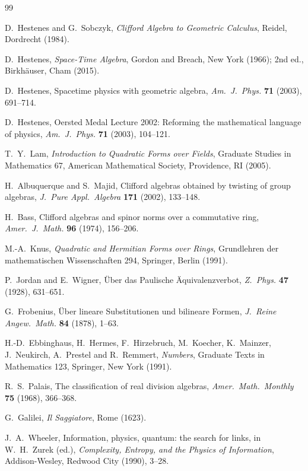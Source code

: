 \documentclass[11pt]{article}
\theoremstyle{plain}
\theoremstyle{definition}
\theoremstyle{plain}
\theoremstyle{definition}
\begin{document}
\begin{thebibliography}{99}

D.~Hestenes and G.~Sobczyk,
\emph{Clifford Algebra to Geometric Calculus},
Reidel, Dordrecht (1984).

D.~Hestenes,
\emph{Space-Time Algebra},
Gordon and Breach, New York (1966); 2nd ed., Birkh\"auser, Cham (2015).

D.~Hestenes,
Spacetime physics with geometric algebra,
\emph{Am.~J.~Phys.} \textbf{71} (2003), 691--714.

D.~Hestenes,
Oersted Medal Lecture 2002: Reforming the mathematical language of physics,
\emph{Am.~J.~Phys.} \textbf{71} (2003), 104--121.

T.~Y.~Lam,
\emph{Introduction to Quadratic Forms over Fields},
Graduate Studies in Mathematics 67, American Mathematical Society, Providence, RI (2005).

H.~Albuquerque and S.~Majid,
Clifford algebras obtained by twisting of group algebras,
\emph{J.~Pure Appl.~Algebra} \textbf{171} (2002), 133--148.

H.~Bass,
Clifford algebras and spinor norms over a commutative ring,
\emph{Amer.~J.~Math.} \textbf{96} (1974), 156--206.

M.-A.~Knus,
\emph{Quadratic and Hermitian Forms over Rings},
Grundlehren der mathematischen Wissenschaften 294, Springer, Berlin (1991).

P.~Jordan and E.~Wigner,
\"Uber das Paulische \"Aquivalenzverbot,
\emph{Z.~Phys.} \textbf{47} (1928), 631--651.

G.~Frobenius,
\"Uber lineare Substitutionen und bilineare Formen,
\emph{J.~Reine Angew.~Math.} \textbf{84} (1878), 1--63.

H.-D.~Ebbinghaus, H.~Hermes, F.~Hirzebruch, M.~Koecher, K.~Mainzer, J.~Neukirch, A.~Prestel and R.~Remmert,
\emph{Numbers},
Graduate Texts in Mathematics 123, Springer, New York (1991).

R.~S.~Palais,
The classification of real division algebras,
\emph{Amer.~Math.~Monthly} \textbf{75} (1968), 366--368.

G.~Galilei,
\emph{Il Saggiatore},
Rome (1623).

J.~A.~Wheeler,
Information, physics, quantum: the search for links,
in W.~H.~Zurek (ed.), \emph{Complexity, Entropy, and the Physics of Information},
Addison-Wesley, Redwood City (1990), 3--28.


\end{thebibliography}
\end{document}

